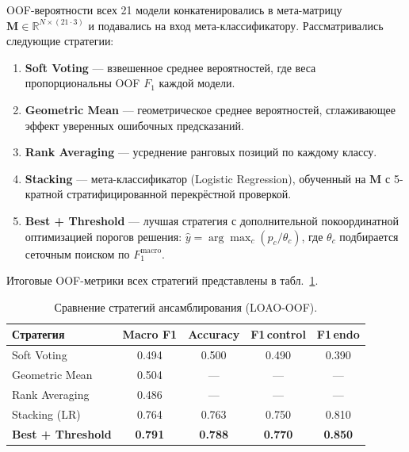 \documentclass[12pt, a4paper]{article}
\begin{document}
OOF-вероятности всех 21 модели конкатенировались в мета-матрицу
$\mathbf{M} \in \mathbb{R}^{N \times (21 \cdot 3)}$ и подавались
на вход мета-классификатору. Рассматривались следующие стратегии:

\begin{enumerate}[leftmargin=1.5cm]
  \item \textbf{Soft Voting} — взвешенное среднее вероятностей,
        где веса пропорциональны OOF $F_1$ каждой модели.
  \item \textbf{Geometric Mean} — геометрическое среднее вероятностей,
        сглаживающее эффект уверенных ошибочных предсказаний.
  \item \textbf{Rank Averaging} — усреднение ранговых позиций
        по каждому классу.
  \item \textbf{Stacking} — мета-классификатор (Logistic Regression),
        обученный на $\mathbf{M}$ с 5-кратной стратифицированной
        перекрёстной проверкой.
  \item \textbf{Best + Threshold} — лучшая стратегия с дополнительной
        покоординатной оптимизацией порогов решения:
        $\hat{y} = \arg\max_c (p_c / \theta_c)$,
        где $\theta_c$ подбирается сеточным поиском по
        $F_1^{\text{macro}}$.
\end{enumerate}

Итоговые OOF-метрики всех стратегий представлены в
табл.~\ref{tab:ensemble}.

\begin{table}[H]
\centering
\caption{Сравнение стратегий ансамблирования (LOAO-OOF).}
\label{tab:ensemble}
\begin{tabular}{lcccc}
\toprule
\textbf{Стратегия} & \textbf{Macro F1} & \textbf{Accuracy} &
\textbf{F1\,control} & \textbf{F1\,endo} \\
\midrule
Soft Voting      & 0.494 & 0.500 & 0.490 & 0.390 \\
Geometric Mean   & 0.504 & —     & —     & —     \\
Rank Averaging   & 0.486 & —     & —     & —     \\
Stacking (LR)    & 0.764 & 0.763 & 0.750 & 0.810 \\
\textbf{Best + Threshold} & \textbf{0.791} & \textbf{0.788} &
\textbf{0.770} & \textbf{0.850} \\
\bottomrule
\end{tabular}
\end{table}


\end{document}

